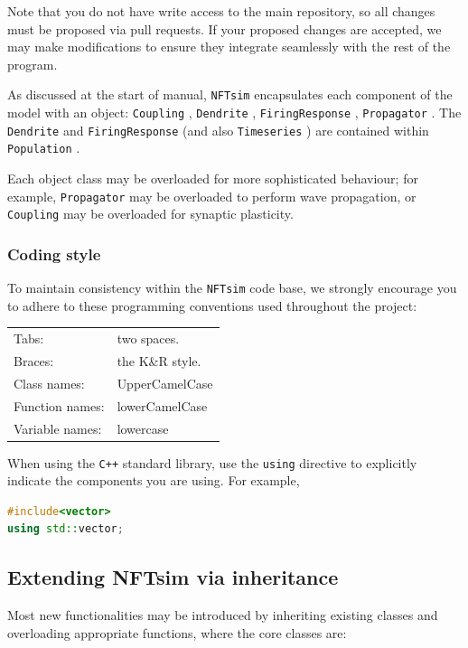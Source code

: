 \documentclass[12pt,a4paper]{article}
\newcommand{\type}[1]{{\small\small\tt #1} }
\newcommand{\NF}[0]{\type{NFTsim}}
\begin{document}
Note that you do not have write access to the main repository, so all changes must be proposed via pull requests. If your proposed changes are accepted, we may make modifications to ensure they integrate seamlessly with the rest of the program.

As discussed at the start of manual, \NF encapsulates each component of the model with an object: \type{Coupling}, \type{Dendrite}, \type{FiringResponse}, \type{Propagator}. The \type{Dendrite} and \type{FiringResponse} (and also \type{Timeseries}) are contained within \type{Population}.

Each object class may be overloaded for more sophisticated behaviour; for example, \type{Propagator} may be overloaded to perform wave propagation, or \type{Coupling} may be overloaded for synaptic plasticity.

\subsubsection{Coding style}

To maintain consistency within the \NF code base, we strongly encourage you to adhere to these programming conventions used throughout the project:

\begin{tabular}{ l l }
    Tabs:& two spaces.\\
    Braces:& the K\&R style.\\
    Class names:&UpperCamelCase\\
    Function names:&lowerCamelCase\\
    Variable names:&lowercase
\end{tabular}

When using the \type{C++} standard library, use the \type{using} directive to explicitly indicate the components you are using. For example,

\begin{lstlisting}[language=C++]
#include<vector>
using std::vector;
\end{lstlisting}

\subsection{Extending NFTsim via inheritance}
\label{sec:extension}

Most new functionalities may be introduced by inheriting existing classes and overloading appropriate functions, where the core classes are:
\end{document}
